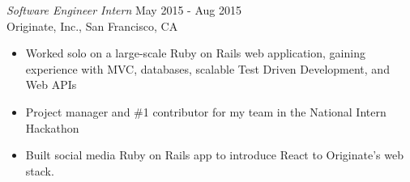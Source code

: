 {\sl Software Engineer Intern} \hfill May 2015 - Aug 2015 \\
Originate, Inc., San Francisco, CA
\begin{itemize} \itemsep -2pt %
  \item Worked solo on a large-scale Ruby on Rails web application, gaining experience with MVC, databases, scalable Test Driven Development, and Web APIs
  \item Project manager and \#1 contributor  for my team in the National Intern Hackathon
  \item Built social media Ruby on Rails app to introduce React to Originate's web stack.
\end{itemize}
